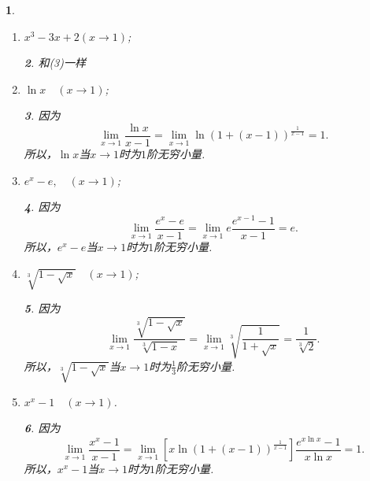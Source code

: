 \documentclass[utf8]{book}
\newtheorem{example}{}[section]             %
\newtheorem{solution}{}
\begin{document}
\begin{example}
\begin{enumerate}
\begin{solution}
所以，$(1+x)(1+x^2)\cdots(1+x^n)$当$x\to +\infty$时为$\frac{n(n+1)}{2}$阶无穷大量.
\end{solution}
\item $x^3-3x+2(x\to 1)$;
\begin{solution}和(3)一样
\end{solution}
\item $\ln{x}\quad(x\to 1)$;
\begin{solution}因为
$$\displaystyle\lim_{x\to 1}\frac{\ln{x}}{x-1}=\displaystyle\lim_{x\to 1}\ln\left(1+(x-1)\right)^{\frac{1}{x-1}}=1.$$
所以，$\ln{x}$当$x\to 1$时为$1$阶无穷小量.
\end{solution}
\item $e^x-e,\quad(x\to 1)$;
\begin{solution}因为
$$\displaystyle\lim_{x\to 1}\frac{e^x-e}{x-1}=\displaystyle\lim_{x\to 1}e\frac{e^{x-1}-1}{x-1}=e.$$
所以，$e^x-e$当$x\to 1$时为$1$阶无穷小量.
\end{solution}
\item $\sqrt[3]{1-\sqrt{x}}\quad(x\to 1)$;
\begin{solution}因为
$$\displaystyle\lim_{x\to 1}\frac{\sqrt[3]{1-\sqrt{x}}}{\sqrt[3]{1-x}}=\displaystyle\lim_{x\to 1}\sqrt[3]{\frac{1}{1+\sqrt{x}}}=\frac{1}{\sqrt[3]{2}}.$$
所以，$\sqrt[3]{1-\sqrt{x}}$当$x\to 1$时为$\frac{1}{3}$阶无穷小量.
\end{solution}
\item $x^x-1\quad(x\to 1)$.
\begin{solution}因为
$$\displaystyle\lim_{x\to 1}\frac{x^x-1}{x-1}=\displaystyle\lim_{x\to 1}\left[x\ln(1+(x-1))^{\frac{1}{x-1}}\right]\frac{e^{x\ln{x}}-1}{x\ln{x}}=1.$$
所以，$x^x-1$当$x\to 1$时为$1$阶无穷小量.
\end{solution}
\end{enumerate}
\end{example}
\end{document}
